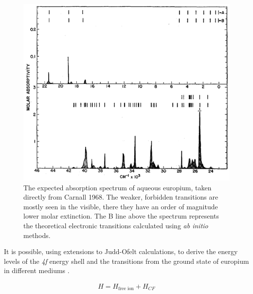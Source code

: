 \begin{figure}[t]
\begin{center}
\includegraphics[width=\textwidth]{figures/eu_spec.png}
\end{center}
\caption[Aqueous Europium Spectrum from Literature]{The expected absorption spectrum of aqueous europium, taken directly from Carnall 1968\cite{Carnall:1968ch}. The weaker, forbidden transitions are mostly seen in the visible, there they have an order of magnitude lower molar extinction. The B line above the spectrum represents the theoretical electronic transitions calculated using \emph{ab initio} methods.}
\label{fig:eu_spec_theory}
\end{figure}

It is possible, using extensions to Judd-Ofelt calculations, to derive the
energy levels of the \textsl{4f} energy shell and the transitions from the
ground state of europium in different mediums
\cite{Carnall:1968ch,Carnall:1989fc,Richardson:1989vf,vanPieterson:2002hd}.

\begin{align}
  H = H_{\text{free ion}} + H_{CF} \label{eq:lan_ham}
\end{align}


